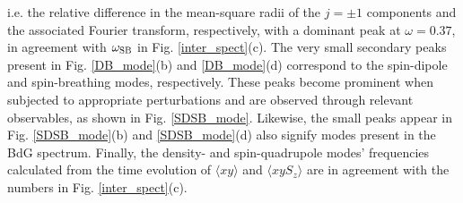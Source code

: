 \documentclass[pra,twocolumn,aps,superscriptaddress,showpacs,longbibliography]{revtex4-1}
\begin{document}
i.e. the relative difference in the mean-square radii of the $j = \pm 1$ components and the 
associated Fourier transform, respectively, with a dominant peak at $\omega=0.37$, in agreement with $\omega_{\rm SB}$ 
in Fig. \ref{inter_spect}(c). The very small secondary peaks present in Fig. \ref{DB_mode}(b) and \ref{DB_mode}(d) correspond to the spin-dipole and spin-breathing modes, respectively. These peaks become prominent when subjected to
appropriate perturbations and are observed through relevant observables, as shown in Fig. \ref{SDSB_mode}.
Likewise, the small peaks appear in Fig. \ref{SDSB_mode}(b) and 
\ref{SDSB_mode}(d) also signify modes present in the BdG spectrum.
Finally, the density- and spin-quadrupole modes' frequencies
calculated from the time evolution of $\langle x y\rangle$ and $\langle x y S_{z}\rangle$ are
in agreement with the numbers in Fig. \ref{inter_spect}(c).

\end{document}
